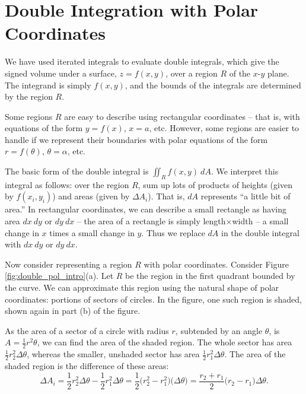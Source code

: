 \section{Double Integration with Polar Coordinates}\label{sec:double_int_polar}

We have used iterated integrals to evaluate double integrals, which give the signed volume under a surface, $z=f(x,y)$, over a region $R$ of the $x$-$y$ plane. The integrand is simply $f(x,y)$, and the bounds of the integrals are determined by the region $R$.

Some regions $R$ are easy to describe using rectangular coordinates -- that is, with equations of the form $y=f(x)$, $x=a$, etc. However, some regions are easier to handle if we represent their boundaries with polar equations of the form $r=f(\theta)$, $\theta = \alpha$, etc. 

The basic form of the double integral is $\iint_R f(x,y)\ dA$. We interpret this integral as follows: over the region $R$, sum up lots of products of heights (given by $f(x_i,y_i)$) and areas (given by $\Delta A_i$). That is, $dA$ represents ``a little bit of area.'' In rectangular coordinates, we can describe a small rectangle as having area $dx\ dy$ or $dy\ dx$ -- the area of a rectangle is simply length$\times$width -- a small change in $x$ times a small change in $y$. Thus we replace $dA$ in the double integral with $dx\ dy$ or $dy\ dx$.

Now consider representing a region $R$ with polar coordinates. Consider Figure \ref{fig:double_pol_intro}(a). Let $R$ be the region in the first quadrant bounded by the curve. We can approximate this region using the natural shape of polar coordinates: portions of sectors of circles. In the figure, one such region is shaded, shown again in part (b) of the figure.

As the area of a sector of a circle with radius $r$, subtended by an angle $\theta$, is $A = \frac12r^2\theta$, we can find the area of the shaded region. The whole sector has area $\frac12r_2^2\Delta \theta$, whereas the smaller, unshaded sector has area $\frac12r_1^2\Delta \theta$. The area of the shaded region is the difference of these areas:
\[
\Delta A_i = \frac12r_2^2\Delta\theta-\frac12r_1^2\Delta\theta = \frac12\big(r_2^2-r_1^2\big)\big(\Delta\theta\big) = \frac{r_2+r_1}{2}\big(r_2-r_1\big)\Delta\theta.
\]

